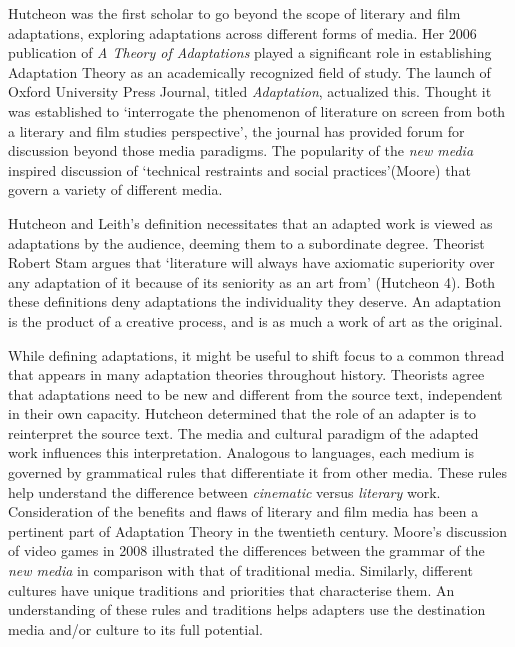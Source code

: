\documentclass[12pt]{article}
\begin{document}
Hutcheon was the first scholar to go beyond the scope of literary and film 
adaptations, exploring adaptations across different forms of media. 
Her 2006 publication of \textit{A Theory of Adaptations} played a significant 
role in establishing Adaptation Theory as an academically recognized field of
study. The launch of Oxford University Press Journal, titled \textit{Adaptation},
actualized this. Thought it was established to `interrogate the phenomenon
of literature on screen from both a literary and film studies perspective', 
the journal has provided forum for discussion beyond those media paradigms.
The popularity of the \textit{new media} inspired discussion of `technical
restraints and social practices'(Moore) that govern a variety of different media. 

Hutcheon and Leith's definition necessitates that an adapted work is
viewed as adaptations by the audience, deeming them to a subordinate
degree. Theorist Robert Stam argues that `literature will always have axiomatic
superiority over any adaptation of it because of its seniority as an art from'
(Hutcheon 4). Both these definitions deny adaptations the individuality
they deserve. An adaptation is the product of a 
creative process, and is as much a work of art as the original. 

While defining adaptations, it might be useful to shift focus to a common thread that
appears in many adaptation theories throughout history. Theorists agree that adaptations 
need to be new and different from the source
text, independent in their own capacity. Hutcheon determined that the role of an adapter is to 
reinterpret the source text. The media and cultural paradigm of the adapted 
work influences this interpretation. Analogous to languages, each medium is
governed by grammatical rules that differentiate it from other media. These
rules help understand the difference between \textit{cinematic} versus
\textit{literary} work. Consideration of the benefits and flaws of literary and
film media has been a pertinent part of Adaptation Theory in the twentieth century.
Moore's discussion of video games in 2008 illustrated the differences between
the grammar of the \textit{new media} in comparison with that of traditional media. 
Similarly, different cultures have unique traditions and priorities
that characterise them. An understanding of these rules and traditions helps 
adapters use the destination media and/or culture to its full potential. 
\end{document}
